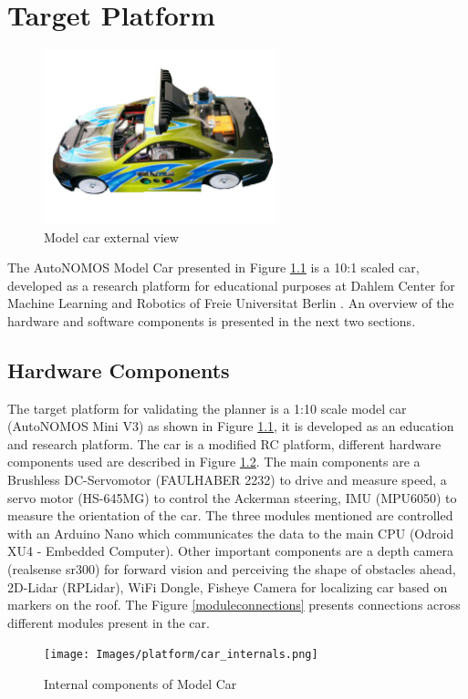 \chapter{Target Platform}
\label{vehicle_info}

\begin{figure}[H]
	\centering
	\includegraphics[width=0.6\textwidth]{Images/platform/car.jpg}
	\caption{Model car external view}
	\label{model_car}
\end{figure}

The AutoNOMOS Model Car presented in Figure \ref{model_car} is a 10:1 scaled car, developed as a research platform for educational purposes at Dahlem Center for Machine Learning and Robotics of Freie Universitat Berlin \cite{dcmlr}. An overview of the hardware and software components is presented in the next two sections. 

\section{Hardware Components}
The target platform for validating the planner is a 1:10 scale model car (AutoNOMOS Mini V3) as shown in Figure \ref{model_car}, it is developed as an education and research platform. The car is a modified RC platform, different hardware components used are described in Figure \ref{internalcar}. The main components are a Brushless DC-Servomotor (FAULHABER 2232) to drive and measure speed, a servo motor (HS-645MG) to control the Ackerman steering, IMU (MPU6050) to measure the orientation of the car. The three modules mentioned are controlled with an Arduino Nano which communicates the data to the main CPU (Odroid XU4 - Embedded Computer). Other important components are a depth camera (realsense sr300) for forward vision and perceiving the shape of obstacles ahead, 2D-Lidar (RPLidar), WiFi Dongle, Fisheye Camera for localizing car based on markers on the roof. The Figure \ref{moduleconnections} presents connections across different modules present in the car.
\begin{figure}
	\centering
	\texttt{[image: Images/platform/car\_internals.png]}
	\caption{Internal components of Model Car \cite{model_car_archi}}
	\label{internalcar}
\end{figure}

